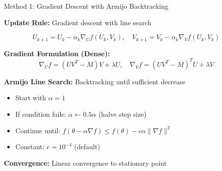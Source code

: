 \documentclass[aspectratio=169,usenames,dvipsnames]{beamer}
\begin{document}
\begin{frame}{Method 1: Gradient Descent with Armijo Backtracking}
    
    \textbf{Update Rule:} Gradient descent with line search
    
    $$U_{k+1} = U_k - \alpha_k \nabla_U f(U_k, V_k), \quad 
    V_{k+1} = V_k - \alpha_k \nabla_V f(U_k, V_k)$$
    
    \vspace{0.3cm}
    
    \textbf{Gradient Formulation (Dense):}
    $$\nabla_U f = (UV^T - M)V + \lambda U, \quad
    \nabla_V f = (UV^T - M)^T U + \lambda V$$
    
    \vspace{0.3cm}
    
    \textbf{Armijo Line Search:} Backtracking until sufficient decrease
    \begin{itemize}
        \item Start with $\alpha = 1$
        \item If condition fails: $\alpha \leftarrow 0.5 \alpha$ (halve step size)
        \item Continue until: $f(\theta - \alpha \nabla f) \leq f(\theta) - c \alpha \|\nabla f\|^2$
        \item Constant: $c = 10^{-4}$ (default)
    \end{itemize}
    
    \vspace{0.3cm}
    
    \textbf{Convergence:} Linear convergence to stationary point
\end{frame}
\end{document}
